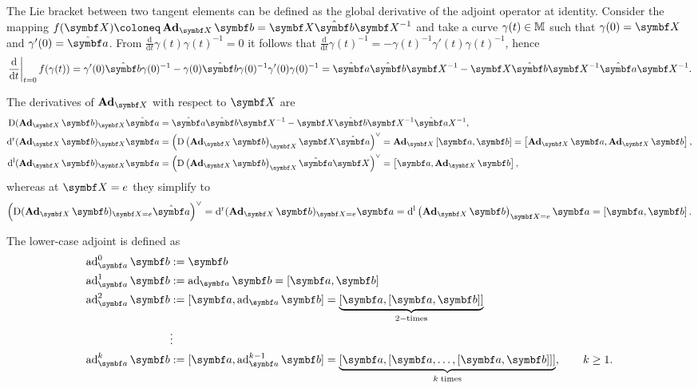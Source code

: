 The Lie bracket between two tangent elements can be defined as the global derivative of the adjoint operator at identity. Consider the mapping $f(\X) \coloneq \bAd_\X \b = \X \hat \b \X^{-1}$ and take a curve $\gamma(t) \in {\mathbb{M}}$ such that $\gamma(0) = \X$ and $\gamma'(0) = \hat \a$. From $\frac{\mathrm{d}}{\mathrm{d}t} \gamma(t) \gamma(t)^{-1} = 0$ it follows that $\frac{\mathrm{d}}{\mathrm{d}t} \gamma(t)^{-1} = - \gamma(t)^{-1} \gamma'(t) \gamma(t)^{-1}$, hence
\begin{equation}
  \left. \frac{\mathrm{d}}{\mathrm{d}t} \right|_{t=0} f(\gamma(t))  = \gamma'(0) \hat \b \gamma(0)^{-1} - \gamma(0) \hat \b \gamma(0)^{-1} \gamma'(0) \gamma(0)^{-1} = \hat \a \hat \b \X^{-1} - \X \hat \b \X^{-1} \hat \a \X^{-1} .
\end{equation}
\begin{properties}
  The derivatives of $\bAd_\X$ with respect to $\X$ are
  \begin{subequations}
    \begin{align}
      \label{eq:bAd_D}
      \mathrm{D} (\bAd_\X \b)_\X \hat \a & = \hat \a \hat \b \X^{-1} - \X \hat \b \X^{-1} \hat \a X^{-1},                                                                                   \\
      \label{eq:bAd_dr}
      \dr (\bAd_\X \b)_\X \a             & = \left( \mathrm{D} \left(\bAd_\X \b \right)_\X \X \hat \a \right)^\vee = \bAd_\X \left[ \a, \b \right] = \left[ \bAd_\X \a, \bAd_\X \b \right], \\
      \label{eq:bAd_dl}
      \dl (\bAd_\X \b)_\X \a             & = \left( \mathrm{D} \left(\bAd_\X \b \right)_\X \hat \a \X \right)^\vee = \left[ \a, \bAd_\X \b \right],
    \end{align}
  \end{subequations}
  whereas at $\X = \id$ they simplify to
  \begin{equation}
    \left( \mathrm{D} (\bAd_\X \b)_{\X = \id} \hat \a \right)^\vee = \dr (\bAd_\X \b)_{\X = \id} \a= \dl \left(\bAd_\X \b \right)_{\X = \id}  \a = \left[ \a, \b \right].
  \end{equation}
\end{properties}
The lower-case adjoint is defined as
\begin{equation}
  \label{eq:lowercase_adjoint}
  \begin{aligned}
    \ad_\a^0 \b & : = \b                                                                                                           \\
    \ad_\a^1 \b & : = \ad_\a \b = [\a,\b]                                                                                          \\
    \ad_\a^2 \b & : = [\a,  \ad_\a \b] = \underbrace{[\a,[\a,\b]]}_{2-\mathrm{times}}                                              \\
                & \vdots                                                                                                           \\
    \ad_\a^k \b & := [\a, \ad_\a^{k - 1} \b] = \underbrace{[\a, [ \a , \ldots, [\a,\b]]]}_{k \; \mathrm{times}} , \qquad k \geq 1.
  \end{aligned}
\end{equation}
